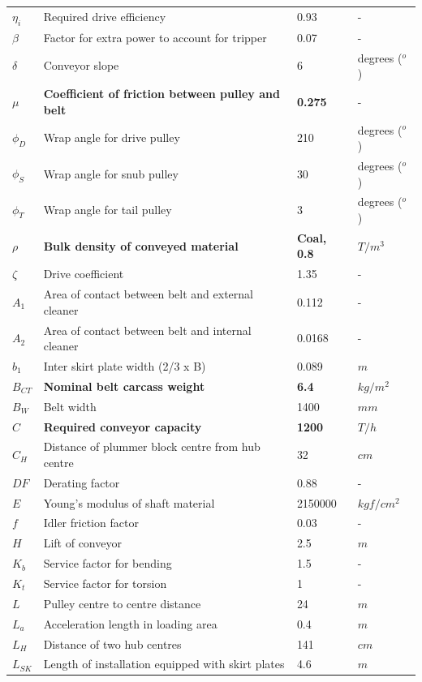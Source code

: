 \begin{table}
\begin{tabular}{ p{1.5cm} p{9cm} p{1.5cm} p{2cm} }
 $\eta_{i}$ & Required drive efficiency  & 0.93 & -\\
$\beta$ & Factor for extra power to account for tripper  & 0.07 & -\\
$\delta$ & Conveyor slope & 6 & degrees ($^o$)\\
$\mu$ &  \textbf{Coefficient of friction between pulley and belt}  & \textbf{0.275} & -\\
$\phi_{D}$ & Wrap angle for drive pulley & 210 & degrees ($^o$)\\
$\phi_{S}$ & Wrap angle for snub pulley & 30 & degrees ($^o$)\\
$\phi_{T}$ & Wrap angle for tail pulley & 3 & degrees ($^o$)\\
$\rho$ & \textbf{Bulk density of conveyed material} & \textbf{Coal, 0.8} & \textbf{$T/m^3$}\\
$\zeta$ & Drive coefficient & 1.35 & -\\
$A_{1}$ & Area of contact between belt and external cleaner & 0.112 & -\\
$A_{2}$ & Area of contact between belt and internal cleaner & 0.0168 & -\\
$b_{1}$ & Inter skirt plate width  (2/3 x B) & 0.089 & $m$\\
$B_{CT}$ &  \textbf{Nominal belt carcass weight} &  \textbf{6.4} & $kg/m^2 $\\
$B_{W}$ & Belt width & 1400 & $mm $\\
$C$ &  \textbf{Required conveyor capacity} &  \textbf{1200} & $T/h$\\
$C_{H}$ & Distance of plummer block centre from hub centre & 32 & $cm$\\
$DF$ & Derating factor & 0.88 & -\\
$E$ & Young's modulus of shaft material & 2150000 & $kgf/cm^2$\\
$f$ & Idler friction factor  & 0.03 & -\\
$H$ & Lift of conveyor & 2.5 & $m $\\
$K_{b}$ & Service factor for bending & 1.5 & -\\
$K_{t}$ & Service factor for torsion  & 1 & -\\
$L$ & Pulley centre to centre distance & 24 & $m$\\
$L_{a}$ & Acceleration length in loading area & 0.4 & $m$\\
$L_{H}$ & Distance of two hub centres & 141 & $cm$\\
$L_{SK}$ & Length of installation equipped with skirt plates  & 4.6 & $m$\\

\end{tabular}
\end{table}

